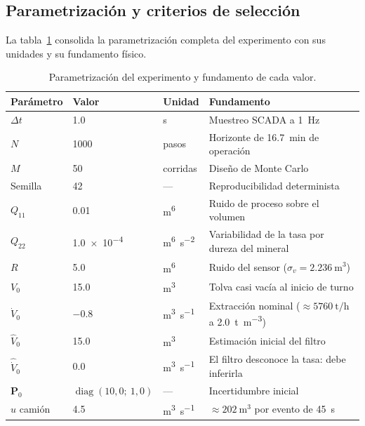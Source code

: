 \subsection{Parametrización y criterios de selección}

La tabla~\ref{tab:parametros} consolida la parametrización completa del
experimento con sus unidades y su fundamento físico.

\begin{table}[H]
\centering
\caption{Parametrización del experimento y fundamento de cada valor.}
\label{tab:parametros}
\footnotesize
\begin{tabular}{@{}llll@{}}
\toprule
\textbf{Parámetro} & \textbf{Valor} & \textbf{Unidad} & \textbf{Fundamento}\\
\midrule
$\Delta t$ & \num{1,0} & \si{\second} & Muestreo SCADA a \SI{1}{\hertz}\\
$N$ & \num{1000} & pasos & Horizonte de \SI{16,7}{\minute} de operación\\
$M$ & \num{50} & corridas & Diseño de Monte Carlo\\
Semilla & \num{42} & --- & Reproducibilidad determinista\\
$Q_{11}$ & \num{0,01} & \si{\metre\tothe{6}} & Ruido de proceso sobre el volumen\\
$Q_{22}$ & \num{1,0e-4} & \si{\metre\tothe{6}\per\second\squared} &
Variabilidad de la tasa por dureza del mineral\\
$R$ & \num{5,0} & \si{\metre\tothe{6}} & Ruido del sensor
($\sigma_v = \SI{2,236}{\metre\cubed}$)\\
$V_{0}$ & \num{15,0} & \si{\metre\cubed} & Tolva casi vacía al inicio de turno\\
$\dot{V}_{0}$ & \num{-0,8} & \si{\metre\cubed\per\second} &
Extracción nominal ($\approx\SI{5760}{\tonne\per\hour}$ a
\SI{2,0}{\tonne\per\metre\cubed})\\
$\hat{V}_{0}$ & \num{15,0} & \si{\metre\cubed} & Estimación inicial del filtro\\
$\hat{\dot{V}}_{0}$ & \num{0,0} & \si{\metre\cubed\per\second} &
El filtro desconoce la tasa: debe inferirla\\
$\mathbf{P}_{0}$ & $\operatorname{diag}(10{,}0;\ 1{,}0)$ & --- &
Incertidumbre inicial\\
$u$ camión & \num{4,5} & \si{\metre\cubed\per\second} &
$\approx\SI{202}{\metre\cubed}$ por evento de \SI{45}{\second}\\
\bottomrule
\end{tabular}
\end{table}

